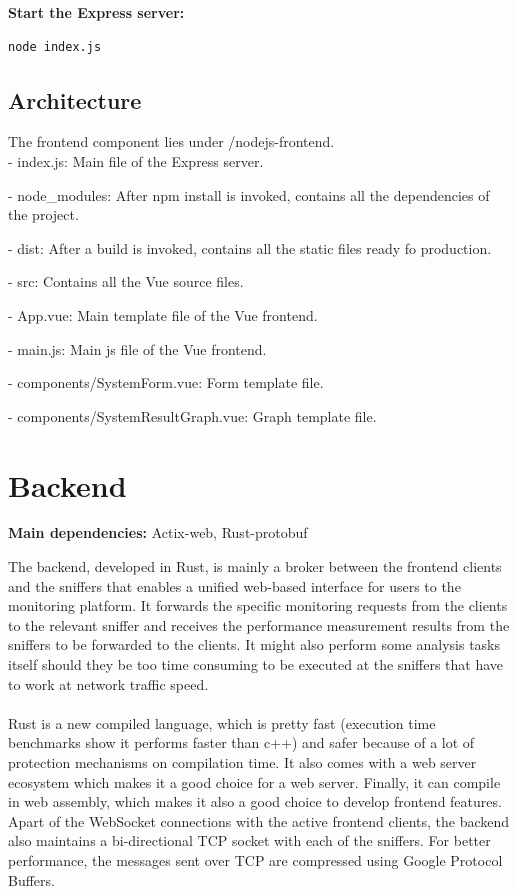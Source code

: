 \documentclass[12pt,hidelinks]{article}
\begin{document}
\textbf{Start the Express server:}
\begin{verbatim}
node index.js
\end{verbatim}

\subsection{Architecture}
The frontend component lies under /nodejs-frontend. \\

- index.js:
Main file of the Express server.

- node\_modules:
After npm install is invoked, contains all the dependencies of the project.

- dist: 
After a build is invoked, contains all the static files ready fo production.

- src:
Contains all the Vue source files.

	\hspace*{10mm}- App.vue:
	Main template file of the Vue frontend.

	\hspace*{10mm}- main.js:
	Main js file of the Vue frontend.

	\hspace*{10mm}- components/SystemForm.vue:
	Form template file.

	\hspace*{10mm}- components/SystemResultGraph.vue:
	Graph template file.

\newpage
\section{Backend}
\vspace{7.5cm}

\textbf{Main dependencies:} Actix-web, Rust-protobuf 

\vspace{3cm}

The backend, developed in Rust, is mainly a broker between the frontend clients and the sniffers that enables a unified web-based interface for users to the monitoring platform. It forwards the specific monitoring requests from the clients to the relevant sniffer and receives the performance measurement results from the sniffers to be forwarded to the clients. It might also perform some analysis tasks itself should they be too time consuming to be executed at the sniffers that have to work at network traffic speed. \\
\\
Rust is a new compiled language, which is pretty fast (execution time benchmarks show it performs faster than c++) and safer because of a lot of protection mechanisms on compilation time. It also comes with a web server ecosystem which makes it a good choice for a web server. Finally, it can compile in web assembly, which makes it also a good choice to develop frontend features. Apart of the WebSocket connections with the active frontend clients, the backend also maintains a bi-directional TCP socket with each of the sniffers. 
For better performance, the messages sent over TCP are compressed using Google Protocol Buffers.\\
\\
\end{document}
